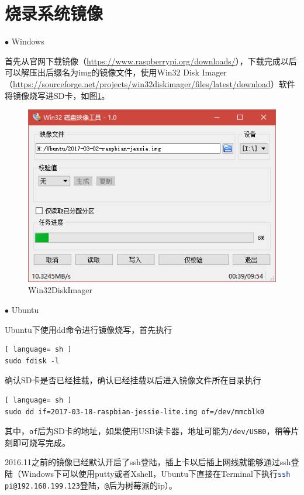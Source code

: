 	\section{烧录系统镜像}
		\par $\bullet$ Windows
		\par 首先从官网下载镜像（\href{https://www.raspberrypi.org/downloads/}{https://www.raspberrypi.org/downloads/}），下载完成以后可以解压出后缀名为img的镜像文件，使用Win32 Disk Imager（\href{https://sourceforge.net/projects/win32diskimager/files/latest/download}{https://sourceforge.net/projects/win32diskimager/files/latest/download}）软件将镜像烧写进SD卡，如图\ref{fig:win32diskimager}。
		\begin{figure}[htp]
			\centering
			\includegraphics[width=13cm]{figures/win32diskimager.png}
			\caption{Win32DiskImager}
			\label{fig:win32diskimager}
		\end{figure}
		\par $\bullet$ Ubuntu
		\par Ubuntu下使用dd命令进行镜像烧写，首先执行
		\begin{lstlisting}[ language= sh ]
sudo fdisk -l
		\end{lstlisting}
		\par 确认SD卡是否已经挂载，确认已经挂载以后进入镜像文件所在目录执行
		\begin{lstlisting}[ language= sh ]
sudo dd if=2017-03-18-raspbian-jessie-lite.img of=/dev/mmcblk0
		\end{lstlisting}
		\par 其中，\lstinline[language=sh]{of}后为SD卡的地址，如果使用USB读卡器，地址可能为\lstinline[language=sh]{/dev/USB0}，稍等片刻即可烧写完成。
		\par 2016.11之前的镜像已经默认开启了ssh登陆，插上卡以后插上网线就能够通过ssh登陆（Windows下可以使用putty或者Xshell，Ubuntu下直接在Terminal下执行\lstinline[language=sh]{ssh pi@192.168.199.123}登陆，\lstinline[language=sh]{@}后为树莓派的ip）。
